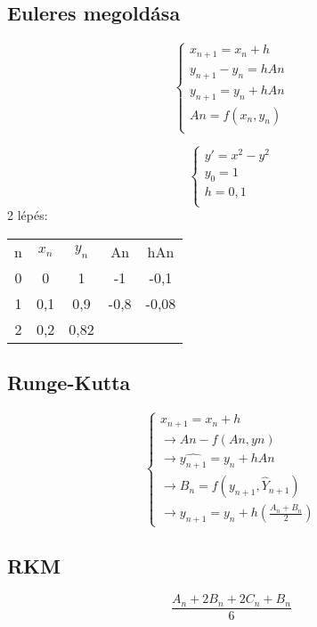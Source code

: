 \documentclass{article}
\begin{document}
\subsection{Euleres megoldása}

\begin{equation}
   \begin{cases}
	x_{n+1}=x_{n}+h \\
	y_{n+1}-y_{n} = hAn \\
	y_{n+1} = y_{n} +hAn \\
	An = f(x_{n},y_{n})\\
    \end{cases}
\end{equation}

\begin{equation}
   \begin{cases}
    y' = x^2-y^2 \\
    y_{0} = 1 \\
    h = 0,1 \\
    \end{cases}
\end{equation}
2 lépés:
\begin{center}
\begin{tabular}{ c c c c c }
 n & $x_{n}$ & $y_{n}$ & An & hAn \\ 
 0 & 0 & 1 & -1 & -0,1  \\  
 1 & 0,1 & 0,9 & -0,8 & -0,08 \\
 2 & 0,2 & 0,82 & & \\    
\end{tabular}
\end{center}

\subsection{Runge-Kutta}

\begin{equation}
   \begin{cases}
    x_{n+1} = x_{n}+h \\
    \rightarrow An - f(An, yn) \\
    \rightarrow \hat{y_{n+1}} = y_{n}+hAn \\
    \rightarrow B_{n} = f(y_{n+1}, \hat{Y}_{n+1}) \\
    \rightarrow y_{n+1} = y_{n}+h(\frac{A_{n}+B_{n}}{2})
    \end{cases}
\end{equation}

\subsection{RKM}

\begin{equation}
   \frac{A_{n}+2B_{n}+2C_{n}+B_{n}}{6}
\end{equation}
\end{document}
